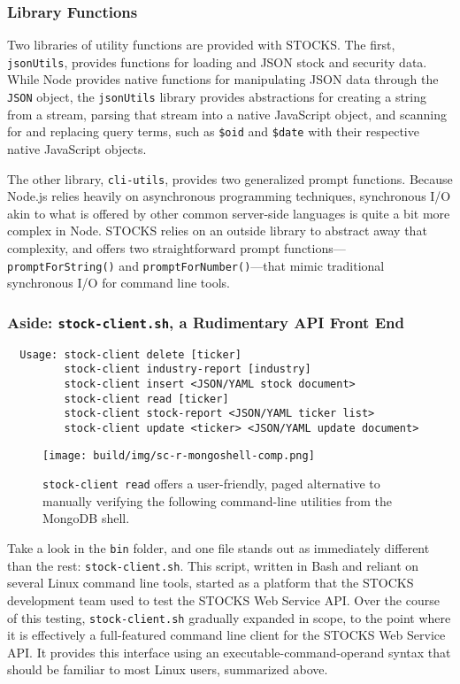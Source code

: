 \documentclass[
11pt,
titlepage,
]{article}
\begin{document}
\subsubsection{Library Functions}

Two libraries of utility functions are provided with STOCKS. The first,
\texttt{jsonUtils}, provides functions for loading and JSON stock and security
data. While Node provides native functions for manipulating JSON data through
the \texttt{JSON} object, the \texttt{jsonUtils} library provides
abstractions for creating a string from a stream, parsing that stream into a
native JavaScript object, and scanning for and replacing query terms, such as
\texttt{\$oid} and \texttt{\$date} with their respective native JavaScript
objects.

The other library, \texttt{cli-utils}, provides two generalized prompt
functions. Because Node.js relies heavily on asynchronous programming
techniques, synchronous I/O akin to what is offered by other common server-side
languages is quite a bit more complex in Node. STOCKS relies on an outside
library to abstract away that complexity, and offers two straightforward prompt
functions---\texttt{promptForString()} and \texttt{promptForNumber()}---that
mimic traditional synchronous I/O for command line tools.

\subsubsection{Aside: \texttt{stock-client.sh}, a Rudimentary API Front End}

\begin{lstlisting}
  Usage: stock-client delete [ticker]
         stock-client industry-report [industry]
         stock-client insert <JSON/YAML stock document>
         stock-client read [ticker]
         stock-client stock-report <JSON/YAML ticker list>
         stock-client update <ticker> <JSON/YAML update document>
\end{lstlisting}

\begin{figure}[tbp]
  \texttt{[image: build/img/sc-r-mongoshell-comp.png]}
  \caption{\texttt{stock-client read} offers a user-friendly, paged alternative
    to manually verifying the following command-line utilities from the MongoDB
    shell.}
  \label{fig:sc-r-mongoshell-comp}
\end{figure}

Take a look in the \texttt{bin} folder, and one file stands out as immediately
different than the rest: \texttt{stock-client.sh}. This script, written in Bash
and reliant on several Linux command line tools, started as a platform that the
STOCKS development team used to test the STOCKS Web Service API. Over the course
of this testing, \texttt{stock-client.sh} gradually expanded in scope, to the
point where it is effectively a full-featured command line client for the STOCKS
Web Service API. It provides this interface using an executable-command-operand
syntax that should be familiar to most Linux users, summarized above.
\end{document}
